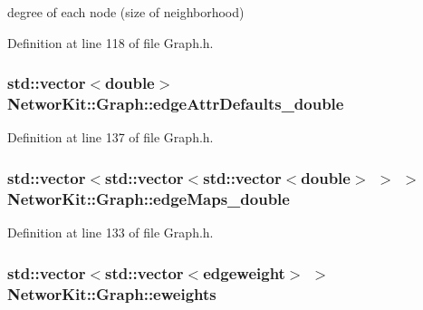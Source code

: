 degree of each node (size of neighborhood) 



Definition at line 118 of file Graph.\-h.

\hypertarget{class_networ_kit_1_1_graph_ac3f25277b53638e1486cde303803eb0a}{
\subsubsection[{edge\-Attr\-Defaults\-\_\-double}]{\setlength{\rightskip}{0pt plus 5cm}std\-::vector$<$double$>$ Networ\-Kit\-::\-Graph\-::edge\-Attr\-Defaults\-\_\-double\hspace{0.3cm}{\ttfamily [protected]}}}\label{class_networ_kit_1_1_graph_ac3f25277b53638e1486cde303803eb0a}


Definition at line 137 of file Graph.\-h.

\hypertarget{class_networ_kit_1_1_graph_a63a00d1d3330ce8050fcd77794ec8d45}{
\subsubsection[{edge\-Maps\-\_\-double}]{\setlength{\rightskip}{0pt plus 5cm}std\-::vector$<$std\-::vector$<$std\-::vector$<$double$>$ $>$ $>$ Networ\-Kit\-::\-Graph\-::edge\-Maps\-\_\-double\hspace{0.3cm}{\ttfamily [protected]}}}\label{class_networ_kit_1_1_graph_a63a00d1d3330ce8050fcd77794ec8d45}


Definition at line 133 of file Graph.\-h.

\hypertarget{class_networ_kit_1_1_graph_a6fb34025f32ff2850911ee0e90b085fa}{
\subsubsection[{eweights}]{\setlength{\rightskip}{0pt plus 5cm}std\-::vector$<$std\-::vector$<${\bf edgeweight}$>$ $>$ Networ\-Kit\-::\-Graph\-::eweights\hspace{0.3cm}{\ttfamily [protected]}}}\label{class_networ_kit_1_1_graph_a6fb34025f32ff2850911ee0e90b085fa}


